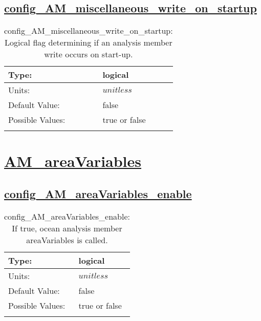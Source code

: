 \subsection[config\_AM\_miscellaneous\_write\_on\_startup]{\hyperref[sec:nm_tab_AM_miscellaneous]{config\_AM\_miscellaneous\_write\_on\_startup}}
\label{subsec:nm_sec_config_AM_miscellaneous_write_on_startup}
\begin{center}
\begin{longtable}{| p{2.0in} || p{4.0in} |}
    \hline
    Type: & logical \\
    \hline
    Units: & $unitless$ \\
    \hline
    Default Value: & false \\
    \hline
    Possible Values: & true or false \\
    \hline
    \caption{config\_AM\_miscellaneous\_write\_on\_startup: Logical flag determining if an analysis member write occurs on start-up.}
\end{longtable}
\end{center}
\section[AM\_areaVariables]{\hyperref[sec:nm_tab_AM_areaVariables]{AM\_areaVariables}}
\label{sec:nm_sec_AM_areaVariables}
\subsection[config\_AM\_areaVariables\_enable]{\hyperref[sec:nm_tab_AM_areaVariables]{config\_AM\_areaVariables\_enable}}
\label{subsec:nm_sec_config_AM_areaVariables_enable}
\begin{center}
\begin{longtable}{| p{2.0in} || p{4.0in} |}
    \hline
    Type: & logical \\
    \hline
    Units: & $unitless$ \\
    \hline
    Default Value: & false \\
    \hline
    Possible Values: & true or false \\
    \hline
    \caption{config\_AM\_areaVariables\_enable: If true, ocean analysis member areaVariables is called.}
\end{longtable}
\end{center}
